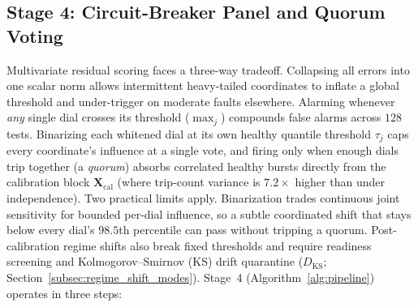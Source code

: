 \subsection{Stage 4: Circuit-Breaker Panel and Quorum Voting}
\label{subsec:scoring_function}
\label{subsubsec:circuit_breaker_panel}
\label{subsubsec:causal_saliency_gating}
Multivariate residual scoring faces a three-way tradeoff. Collapsing all errors into one scalar norm allows intermittent heavy-tailed coordinates to inflate a global threshold and under-trigger on moderate faults elsewhere. Alarming whenever \emph{any} single dial crosses its threshold ($\max_j$) compounds false alarms across $128$ tests. Binarizing each whitened dial at its own healthy quantile threshold $\tau_j$ caps every coordinate's influence at a single vote, and firing only when enough dials trip together (a \emph{quorum}) absorbs correlated healthy bursts directly from the calibration block $\mathbf{X}_{\text{cal}}$ (where trip-count variance is $7.2\times$ higher than under independence). Two practical limits apply. Binarization trades continuous joint sensitivity for bounded per-dial influence, so a subtle coordinated shift that stays below every dial's $98.5$th percentile can pass without tripping a quorum. Post-calibration regime shifts also break fixed thresholds and require readiness screening and Kolmogorov--Smirnov (KS) drift quarantine ($D_{\text{KS}}$; Section~\ref{subsec:regime_shift_modes}). Stage~4 (Algorithm~\ref{alg:pipeline}) operates in three steps:
